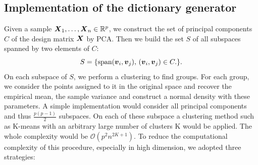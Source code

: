 \subsection{Implementation of the dictionary generator}

Given a sample $\boldsymbol X_1,\dots,\boldsymbol X_n\in{\mathbb R}^p$, we construct the set of principal components $C$ of the design matrix $\boldsymbol X$ by PCA. Then we build the set $S$ of all subspaces spanned by two elements of $C$:
\begin{equation}
  S = \{\textnormal{span}(\boldsymbol v_i,\boldsymbol v_j),\, (\boldsymbol v_i,\boldsymbol v_j) \in C.\}.
\end{equation}
On each subspace of $S$, we perform a clustering to find groups. For each group, we consider the points assigned to it in the original space and recover the empirical mean, the sample variance and construct a normal density with these parameters. A simple implementation would consider all principal components and thus $\frac{p(p-1)}{2}$ subspaces. On each of these subspace a clustering method such as K-means with an arbitrary large number of clusters K would be applied. The whole complexity would be $\mathcal{O}(p^2n^{2K+1})$. To reduce the computational complexity of this procedure, especially in high dimension, we adopted three strategies:
